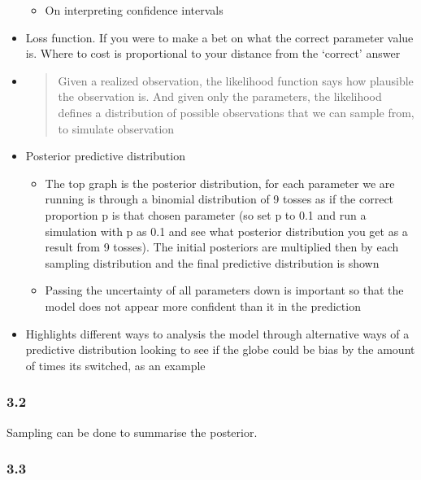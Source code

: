 \documentclass[11pt]{article}
\begin{document}
\begin{itemize}
  \begin{itemize}
  \tightlist
  \item
    On interpreting confidence intervals
  \end{itemize}
\item
  Loss function. If you were to make a bet on what the correct parameter
  value is. Where to cost is proportional to your distance from the
  `correct' answer
\item
  \begin{quote}
  Given a realized observation, the likelihood function says how
  plausible the observation is. And given only the parameters, the
  likelihood defines a distribution of possible observations that we can
  sample from, to simulate observation
  \end{quote}
\item
  Posterior predictive distribution

  \begin{itemize}
  \tightlist
  \item
    The top graph is the posterior distribution, for each parameter we
    are running is through a binomial distribution of 9 tosses as if the
    correct proportion p is that chosen parameter (so set p to 0.1 and
    run a simulation with p as 0.1 and see what posterior distribution
    you get as a result from 9 tosses). The initial posteriors are
    multiplied then by each sampling distribution and the final
    predictive distribution is shown
  \item
    Passing the uncertainty of all parameters down is important so that
    the model does not appear more confident than it in the prediction
  \end{itemize}
\item
  Highlights different ways to analysis the model through alternative
  ways of a predictive distribution looking to see if the globe could be
  bias by the amount of times its switched, as an example
\end{itemize}

\hypertarget{section-3}{%
\subsubsection{3.2}\label{section-3}}

Sampling can be done to summarise the posterior.

\hypertarget{section-4}{%
\subsubsection{3.3}\label{section-4}}
\end{document}
